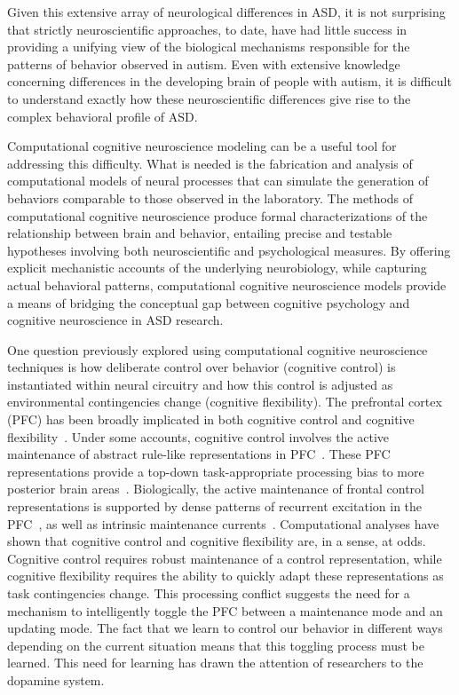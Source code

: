 Given this extensive array of neurological differences in ASD, it is not surprising that strictly neuroscientific approaches, to date, have had little success in providing a unifying view of the biological mechanisms responsible for the patterns of behavior observed in autism. Even with extensive knowledge concerning differences in the developing brain of people with autism, it is difficult to understand exactly how these neuroscientific differences give rise to the complex behavioral profile of ASD.

Computational cognitive neuroscience modeling can be a useful tool for addressing this difficulty. What is needed is the fabrication and analysis of computational models of neural processes that can simulate the generation of behaviors comparable to those observed in the laboratory. The methods of computational cognitive neuroscience produce formal characterizations of the relationship between brain and behavior, entailing precise and testable hypotheses involving both neuroscientific and psychological measures. By offering explicit mechanistic accounts of the underlying neurobiology, while capturing actual behavioral patterns, computational cognitive neuroscience models provide a means of bridging the conceptual gap between cognitive psychology and cognitive neuroscience in ASD research.

One question previously explored using computational cognitive neuroscience techniques is how deliberate control over behavior (cognitive control) is instantiated within neural circuitry and how this control is adjusted as environmental contingencies change (cognitive flexibility). The prefrontal cortex (PFC) has been broadly implicated in both cognitive control and cognitive flexibility~\cite{Stuss:2000:WCSTLesion,Stuss:2001:StroopLesion}. Under some accounts, cognitive control involves the active maintenance of abstract rule-like representations in PFC~\cite{NoelleDC:2012:Rules}. These PFC representations provide a top-down task-appropriate processing bias to more posterior brain areas~\cite{CohenJD:1990:Stroop,RefWorks:154}. Biologically, the active maintenance of frontal control representations is supported by dense patterns of recurrent excitation in the PFC~\cite{PucakML:1996:Stripes}, as well as intrinsic maintenance currents~\cite{Goldman-RakicPS:1987:PFC_Maintenance}. Computational analyses have shown that cognitive control and cognitive flexibility are, in a sense, at odds. Cognitive control requires robust maintenance of a control representation, while cognitive flexibility requires the ability to quickly adapt these representations as task contingencies change. This processing conflict suggests the need for a mechanism to intelligently toggle the PFC between a maintenance mode and an updating mode. The fact that we learn to control our behavior in different ways depending on the current situation means that this toggling process must be learned. This need for learning has drawn the attention of researchers to the dopamine system.   

